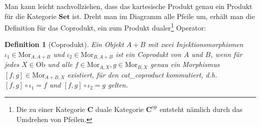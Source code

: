 \documentclass[a4paper, bibgerm]{article}
\newcommand\abb{}
\newtheorem{defi}{Definition}
\begin{document}
Man kann leicht nachvollziehen, dass das kartesische Produkt genau ein
Produkt für die Kategorie $\mathbf{Set}$ ist. Dreht man im Diagramm alle
Pfeile um, erhält man die Definition für das Coprodukt, ein zum Produkt
dualer\footnote{Die zu einer Kategorie $\mathbf{C}$ duale Kategorie
  $\mathbf{C}^{\mathrm{op}}$ entsteht nämlich durch das Umdrehen von
  Pfeilen.} Operator:

\begin{defi}[Coprodukt]
  Ein Objekt $A + B$ mit zwei Injektionsmorphismen $\iota_1
  \in \mathrm{Mor}_{A,A + B}$ und $\iota_2 \in \mathrm{Mor}_{B,A +
    B}$ ist ein Coprodukt von $A$ und $B$, wenn für jedes $X \in
  \mathrm{Ob}$ und alle $f \in \mathrm{Mor}_{A,X},g \in
  \mathrm{Mor}_{B,X}$ genau ein Morphismus
  $[f,g] \in \mathrm{Mor}_{A + B,X}$ existiert, für den \abb{cat_coproduct} kommutiert, d.h. 
  $[f,g] \circ \iota_1 = f$ und $[f,g] \circ \iota_2 = g$ gelten.
\end{defi}


\end{document}
